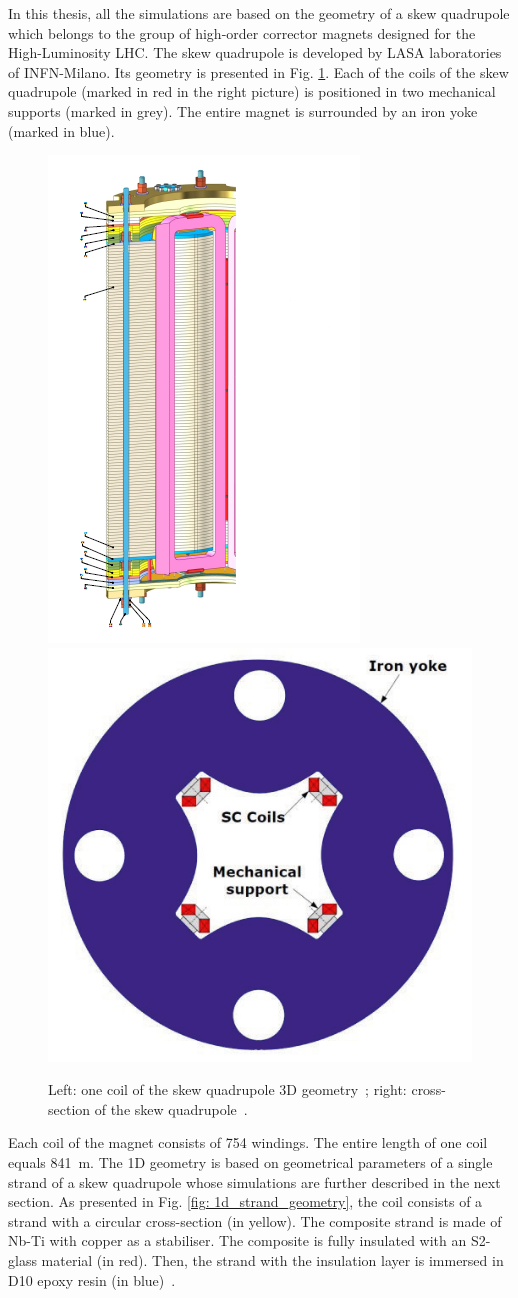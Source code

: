
In this thesis, all the simulations are based on the geometry of a skew quadrupole which belongs to the group of high-order corrector magnets designed for the High-Luminosity LHC. The skew quadrupole is developed by LASA laboratories of INFN-Milano. Its geometry is presented in Fig. \ref{fig:Skew_quad_geometry}. Each of the coils of the skew quadrupole (marked in red in the right picture) is positioned in two mechanical supports (marked in grey). The entire magnet is surrounded by an iron yoke (marked in blue). 

\begin{figure}[H]
    \centering
    \includegraphics[width=0.225\linewidth]{sections/1D_quench_modelling/figures/geometry/SkewQuad3D.png}
    \includegraphics[width=0.30\linewidth]{sections/1D_quench_modelling/figures/geometry/Quadrupole_Cross_Section.png}
    \caption{Left: one coil of the skew quadrupole 3D geometry~\cite{marco_prioli_mails}; right: cross-section of the skew quadrupole~\cite[p.~103-105]{hl_lhc_tech_design_report_v01}.}
    \label{fig:Skew_quad_geometry}
\end{figure}

Each coil of the magnet consists of 754 windings. The entire length of one coil equals 841~m. The 1D geometry is based on geometrical parameters of a single strand of a skew quadrupole whose simulations are further described in the next section. As presented in Fig. \ref{fig: 1d_strand_geometry}, the coil consists of a strand with a circular cross-section (in yellow). The composite strand is made of Nb-Ti with copper as a stabiliser. The composite is fully insulated with an S2-glass material (in red). Then, the strand with the insulation layer is immersed in D10 epoxy resin (in blue)~\cite[p.~103-105]{hl_lhc_tech_design_report_v01}.

